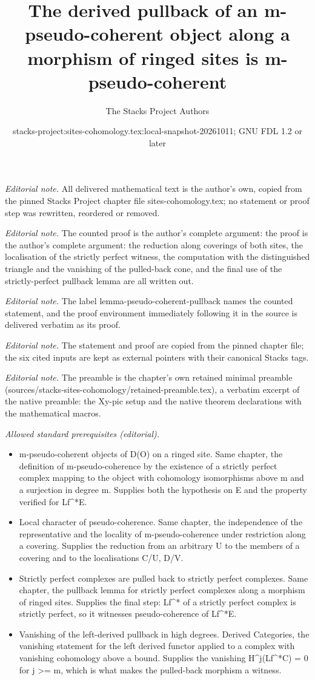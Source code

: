 \documentclass[10pt,a4paper]{amsart}
\title{The derived pullback of an m-pseudo-coherent object along a morphism of ringed sites is m-pseudo-coherent}
\author{The Stacks Project Authors}
\date{stacks-project:sites-cohomology.tex:local-snapshot-20261011; GNU FDL 1.2 or later}
\theoremstyle{plain}
\theoremstyle{definition}
\theoremstyle{remark}
\numberwithin{equation}{subsection}
\begin{document}
\maketitle
\noindent\textit{Editorial note.} All delivered mathematical text is the author's own, copied from the pinned Stacks Project chapter file sites-cohomology.tex; no statement or proof step was rewritten, reordered or removed.\par\medskip
\noindent\textit{Editorial note.} The counted proof is the author's complete argument: the proof is the author's complete argument: the reduction along coverings of both sites, the localisation of the strictly perfect witness, the computation with the distinguished triangle and the vanishing of the pulled-back cone, and the final use of the strictly-perfect pullback lemma are all written out.\par\medskip
\noindent\textit{Editorial note.} The label lemma-pseudo-coherent-pullback names the counted statement, and the proof environment immediately following it in the source is delivered verbatim as its proof.\par\medskip
\noindent\textit{Editorial note.} The statement and proof are copied from the pinned chapter file; the six cited inputs are kept as external pointers with their canonical Stacks tags.\par\medskip
\noindent\textit{Editorial note.} The preamble is the chapter's own retained minimal preamble (sources/stacks-sites-cohomology/retained-preamble.tex), a verbatim excerpt of the native preamble: the Xy-pic setup and the native theorem declarations with the mathematical macros.\par\medskip
\noindent\textit{Allowed standard prerequisites (editorial).}\begin{itemize}
\item m-pseudo-coherent objects of D(O) on a ringed site. Same chapter, the definition of m-pseudo-coherence by the existence of a strictly perfect complex mapping to the object with cohomology isomorphisms above m and a surjection in degree m. Supplies both the hypothesis on E and the property verified for Lf\textasciicircum{}*E.
\item Local character of pseudo-coherence. Same chapter, the independence of the representative and the locality of m-pseudo-coherence under restriction along a covering. Supplies the reduction from an arbitrary U to the members of a covering and to the localisations C/U, D/V.
\item Strictly perfect complexes are pulled back to strictly perfect complexes. Same chapter, the pullback lemma for strictly perfect complexes along a morphism of ringed sites. Supplies the final step: Lf\textasciicircum{}* of a strictly perfect complex is strictly perfect, so it witnesses pseudo-coherence of Lf\textasciicircum{}*E.
\item Vanishing of the left-derived pullback in high degrees. Derived Categories, the vanishing statement for the left derived functor applied to a complex with vanishing cohomology above a bound. Supplies the vanishing H\textasciicircum{}j(Lf\textasciicircum{}*C) = 0 for j >= m, which is what makes the pulled-back morphism a witness.
\end{itemize}\medskip
\end{document}
